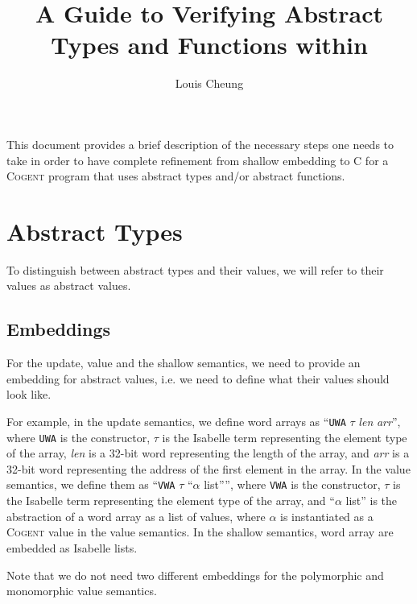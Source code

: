 \documentclass{article}
\title{A Guide to Verifying Abstract Types and Functions within \cogent}
\author{Louis Cheung}
\newcommand{\cogent}{\textsc{Cogent}\xspace}
\newcommand{\Cogent}{\textsc{Cogent}\xspace}
\begin{document}
\maketitle

This document provides a brief description of the necessary steps one needs
to take in order to have complete refinement from shallow embedding to C
for a \cogent program that uses abstract types and/or abstract functions.

\section{Abstract Types}
To distinguish between abstract types and their values, we will refer to
their values as abstract values.

\subsection{Embeddings}
For the update, value and the shallow semantics, we need to provide an
embedding for abstract values,
i.e. we need to define what their values should look like.

For example, in the update semantics, we define word arrays as
{``\texttt{UWA} $\tau$ \textit{len} \textit{arr}''},
where \texttt{UWA} is the constructor,
$\tau$ is the Isabelle term representing the element type of the array,
\textit{len} is a 32-bit word representing the length of the array,
and \textit{arr} is a 32-bit word representing the address of the first
element in the array.
In the value semantics, we define them as
{``\texttt{VWA} $\tau$ ``$\alpha$ list''''},
where \texttt{VWA} is the constructor,
$\tau$ is the Isabelle term representing the element type of the array,
and ``$\alpha$ list'' is the abstraction of a word array as a list of values,
where $\alpha$ is instantiated as a \Cogent value in the value semantics.
In the shallow semantics, word array are embedded as Isabelle lists.

Note that we do not need two different embeddings for the polymorphic and
monomorphic value semantics.
\end{document}

